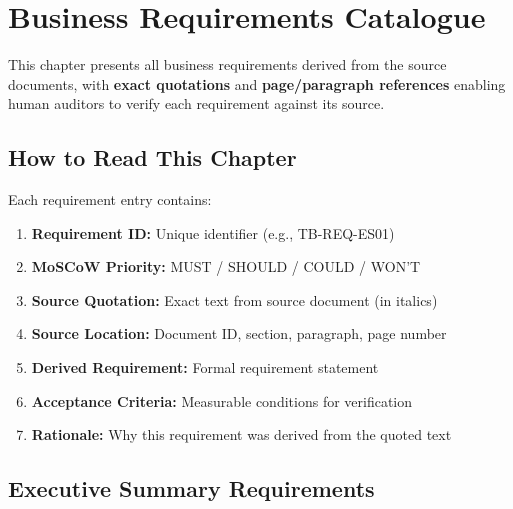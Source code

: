 \chapter{Business Requirements Catalogue}
\label{ch:business-requirements}

This chapter presents all business requirements derived from the source documents,
with \textbf{exact quotations} and \textbf{page/paragraph references} enabling 
human auditors to verify each requirement against its source.

\section{How to Read This Chapter}

Each requirement entry contains:

\begin{tcolorbox}[colback=blue!5,colframe=blue!75!black,title=Requirement Entry Format]
\begin{enumerate}[leftmargin=*]
    \item \textbf{Requirement ID:} Unique identifier (e.g., TB-REQ-ES01)
    \item \textbf{MoSCoW Priority:} MUST / SHOULD / COULD / WON'T
    \item \textbf{Source Quotation:} Exact text from source document (in italics)
    \item \textbf{Source Location:} Document ID, section, paragraph, page number
    \item \textbf{Derived Requirement:} Formal requirement statement
    \item \textbf{Acceptance Criteria:} Measurable conditions for verification
    \item \textbf{Rationale:} Why this requirement was derived from the quoted text
\end{enumerate}
\end{tcolorbox}

\section{Executive Summary Requirements}
\label{sec:req-executive}


